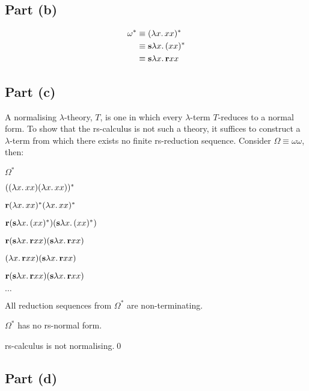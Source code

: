\subsection{Part (b)}\label{sec:q-2-b}

\begin{align*}
  \omega^* & \equiv (\lambda x\ldotp xx)^*\\
  & \equiv \mathbf{s}\lambda x\ldotp (xx)^*\\
  & \equiv \mathbf{s}\lambda x\ldotp \mathbf{r}xx
\end{align*}

\subsection{Part (c)}\label{sec:q-2-c}

A normalising $\lambda$-theory, $T$, is one in which every $\lambda$-term $T$-reduces to a normal form. To show that the rs-calculus is not such a theory, it suffices to construct a $\lambda$-term from which there exists no finite rs-reduction sequence. Consider $\Omega\equiv\omega\omega$, then:

\begin{itemize}

  \step $\Omega^*$

  \step[\equiv] $((\lambda x\ldotp xx)(\lambda x\ldotp xx))^*$

  \step[\equiv] $\mathbf{r}(\lambda x\ldotp xx)^*(\lambda x\ldotp xx)^*$

  \step[\equiv] $\mathbf{r}(\mathbf{s}\lambda x\ldotp (xx)^*)(\mathbf{s}\lambda x\ldotp (xx)^*)$

  \step[\equiv] $\mathbf{r}(\mathbf{s}\lambda x\ldotp \mathbf{r}xx)(\mathbf{s}\lambda x\ldotp \mathbf{r}xx)$

  \step[\to_{\text rs}] $(\lambda x\ldotp \mathbf{r}xx)(\mathbf{s}\lambda x\ldotp \mathbf{r}xx)$

  \step[\to_{\text rs}] $\mathbf{r}(\mathbf{s}\lambda x\ldotp \mathbf{r}xx)(\mathbf{s}\lambda x\ldotp \mathbf{r}xx)$

  \step[\to_{\text rs}] $\ldots$

  \step[\imps] All reduction sequences from $\Omega^*$ are non-terminating.

  \step[\imps] $\Omega^*$ has no rs-normal form.

  \step[\imps] rs-calculus is not normalising.\hfill\qed
\end{itemize}

\subsection{Part (d)}\label{sec:q-2-d}

